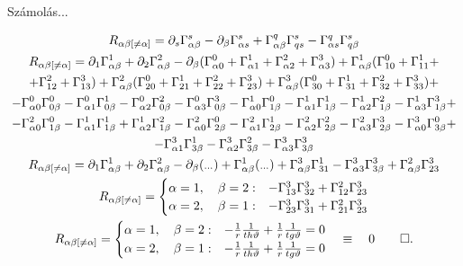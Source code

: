 \documentclass[10pt]{beamer}
\begin{document}
\begin{frame}[t]{Számolás...}

\begin{gather*}
R_{\alpha\beta[\neq \alpha]} = \partial_{s}\Gamma_{\alpha\beta}^{s} - \partial_{\beta}\Gamma_{\alpha s}^{s} + \Gamma_{\alpha\beta}^{q}\Gamma_{qs}^{s}
- \Gamma_{\alpha s}^{q}\Gamma_{q\beta}^{s} \\
R_{\alpha\beta[\neq \alpha]} = \partial_{1}\Gamma_{\alpha\beta}^{1} +  \partial_{2}\Gamma_{\alpha\beta}^{2} - \partial_{\beta}(
\Gamma_{\alpha 0}^{0} + \Gamma_{\alpha 1}^{1} + \Gamma_{\alpha 2}^{2} + \Gamma_{\alpha 3}^{3}) + \Gamma_{\alpha\beta}^{1}(
\Gamma_{10}^{0} + \Gamma_{11}^{1} +  \\
+ \Gamma_{12}^{2} + \Gamma_{13}^{3}) + \Gamma_{\alpha\beta}^{2}(\Gamma_{20}^{0} + \Gamma_{21}^{1} + \Gamma_{22}^{2} + \Gamma_{23}^{3})
+ \Gamma_{\alpha\beta}^{3}(\Gamma_{30}^{0} + \Gamma_{31}^{1} + \Gamma_{32}^{2} + \Gamma_{33}^{3}) + \\
- \Gamma_{\alpha 0}^{0}\Gamma_{0\beta}^{0} - \Gamma_{\alpha 1}^{0}\Gamma_{0 \beta}^{1} - \Gamma_{\alpha 2}^{0}\Gamma_{0 \beta}^{2}
- \Gamma_{\alpha 3}^{0}\Gamma_{0 \beta}^{3} - \Gamma_{\alpha 0}^{1}\Gamma_{1 \beta}^{0} -\Gamma_{\alpha 1}^{1}\Gamma_{1 \beta}^{1}
- \Gamma_{\alpha 2}^{1}\Gamma_{1 \beta}^{2} - \Gamma_{\alpha 3}^{1}\Gamma_{1 \beta}^{3} + \\
- \Gamma_{\alpha 0}^{2}\Gamma_{1 \beta}^{0} - \Gamma_{\alpha 1}^{1}\Gamma_{1 \beta}^{1} + \Gamma_{\alpha 2}^{1}\Gamma_{1 \beta}^{2}
- \Gamma_{\alpha 0}^{2}\Gamma_{2 \beta}^{0} - \Gamma_{\alpha 1}^{2}\Gamma_{2 \beta}^{1} - \Gamma_{\alpha 2}^{2}\Gamma_{2 \beta}^{2}
- \Gamma_{\alpha 3}^{2}\Gamma_{2 \beta}^{3} - \Gamma_{\alpha 0}^{3}\Gamma_{3 \beta}^{0} + \\
- \Gamma_{\alpha 1}^{3}\Gamma_{3 \beta}^{1} - \Gamma_{\alpha 2}^{3}\Gamma_{3 \beta}^{2} - \Gamma_{\alpha 3}^{3}\Gamma_{3 \beta}^{3} \\
R_{\alpha\beta[\neq \alpha]} = \partial_{1}\Gamma_{\alpha \beta}^{1} + \partial_{2}\Gamma_{\alpha \beta}^{2} - \partial_{\beta}(_{\cdots}) +
\Gamma_{\alpha \beta}^{1}(_{\cdots}) + \Gamma_{\alpha\beta}^{3}\Gamma_{31}^{1} - \Gamma_{\alpha 3}^{3}\Gamma_{3 \beta}^{3} + \Gamma_{\alpha \beta}^{2}\Gamma_{23}^{3} \\
R_{\alpha\beta[\neq \alpha]} = 
\begin{cases}
\alpha = 1, \quad \beta = 2 : & -\Gamma_{13}^{3}\Gamma_{32}^{3} + \Gamma_{12}^{2}\Gamma_{23}^{3} \\
\alpha = 2,  \quad \beta = 1 : & -\Gamma_{23}^{3}\Gamma_{31}^{3} + \Gamma_{21}^{2}\Gamma_{23}^{3}  
\end{cases} \\
R_{\alpha\beta[\neq \alpha]} = 
\begin{cases}
\alpha = 1, \quad \beta = 2 : &  -\frac{1}{r}\frac{1}{th\vartheta} + \frac{1}{r}\frac{1}{tg\vartheta} = 0\\
\alpha = 2,  \quad \beta = 1 : &   -\frac{1}{r}\frac{1}{th\vartheta} + \frac{1}{r}\frac{1}{tg\vartheta} = 0
\end{cases} \quad \equiv \quad 0  \qed. 
\end{gather*}
\end{frame}
\end{document}
